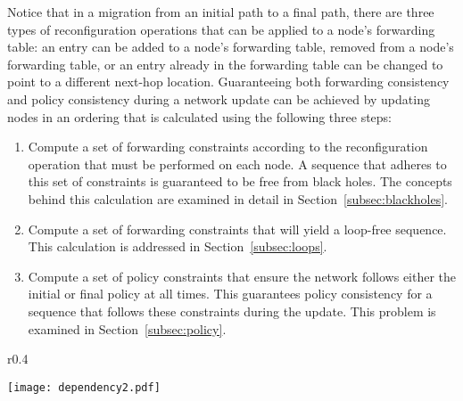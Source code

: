 \documentclass[pageno]{jpaper}
\begin{document}
Notice that in a migration from an initial path to a final path, there are three types of reconfiguration operations that can be applied to a node's forwarding table: an entry can be added to a node's forwarding table, removed from a node's forwarding table, or an entry already in the forwarding table can be changed to point to a different next-hop location. Guaranteeing both forwarding consistency and policy consistency during a network update can be achieved by updating nodes in an ordering that is calculated using the following three steps:\\

\begin{enumerate}
\item Compute a set of forwarding constraints according to the reconfiguration operation that must be performed on each node. A sequence that adheres to this set of constraints is guaranteed to be free from black holes. The concepts behind this calculation are examined in detail in Section~\ref{subsec:blackholes}.
\item Compute a set of forwarding constraints that will yield a loop-free sequence. This calculation is addressed in Section~\ref{subsec:loops}.
\item Compute a set of policy constraints that ensure the network follows either the initial or final policy at all times. This guarantees policy consistency for a sequence that follows these constraints during the update. This problem is examined in Section~\ref{subsec:policy}. \\
\end{enumerate}

\begin{wrapfigure}{r}{0.4\textwidth}
    \vspace{-40pt}
    \caption{\label{fig:dependency2}}
    \texttt{[image: dependency2.pdf]}
    \vspace{-20pt}
\end{wrapfigure}
\end{document}
